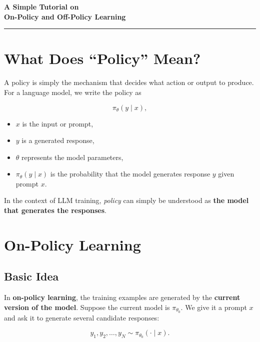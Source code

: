 \documentclass[11pt]{article}
\begin{document}
\begin{center}
  {\Huge\bfseries\color{deepblue} A Simple Tutorial on\\[2pt] On-Policy and Off-Policy Learning}\\[4pt]
  {\color{accent}\rule{0.4\linewidth}{1pt}}
\end{center}
\vspace{8pt}

\section*{What Does ``Policy'' Mean?}

A policy is simply the mechanism that decides what action or output to produce. For a language model, we write the policy as

\[
\pi_\theta(y \mid x),
\]

\begin{itemize}[leftmargin=1.4em]
  \item $x$ is the input or prompt,
  \item $y$ is a generated response,
  \item $\theta$ represents the model parameters,
  \item $\pi_\theta(y \mid x)$ is the probability that the model generates response $y$ given prompt $x$.
\end{itemize}

\begin{plainbox}
In the context of LLM training, \emph{policy} can simply be understood as \textbf{the model that generates the responses}.
\end{plainbox}

\section*{On-Policy Learning}

\subsection*{Basic Idea}

In \textbf{on-policy learning}, the training examples are generated by the \textbf{current version of the model}. Suppose the current model is $\pi_{\theta_0}$. We give it a prompt $x$ and ask it to generate several candidate responses:

\[
y_1,y_2,\ldots,y_N \sim \pi_{\theta_0}(\cdot \mid x).
\]
\end{document}
